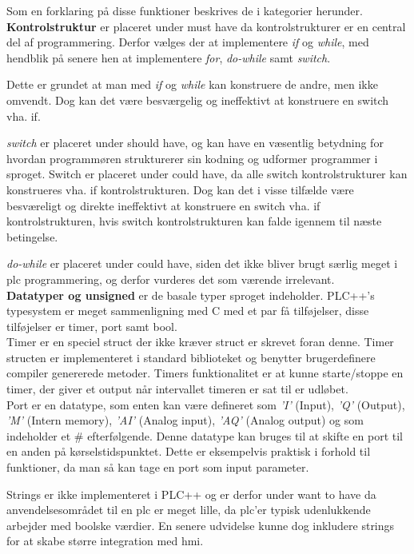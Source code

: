 \noindent Som en forklaring på disse funktioner beskrives de i kategorier herunder.\\

\noindent\textbf{Kontrolstruktur}
er placeret under must have da kontrolstrukturer er en central del af programmering.
Derfor vælges der at implementere \textit{if} og \textit{while}, med hendblik på senere hen at implementere \textit{for}, \textit{do-while} samt \textit{switch}.

Dette er grundet at man med \textit{if} og \textit{while} kan konstruere de andre, men ikke omvendt. Dog kan det være besværgelig og ineffektivt at konstruere en switch vha. if.

\textit{switch} er placeret under should have, og kan have en væsentlig betydning for hvordan programmøren strukturerer sin kodning og udformer programmer i sproget.
Switch er placeret under could have, da alle switch kontrolstrukturer kan konstrueres vha. if kontrolstrukturen. Dog kan det i visse tilfælde være besværeligt og direkte ineffektivt at konstruere en switch vha. if kontrolstrukturen, hvis switch kontrolstrukturen kan falde igennem til næste betingelse.

\textit{do-while} er placeret under could have, siden det ikke bliver brugt særlig meget i \gls{plc} programmering, og derfor vurderes det som værende irrelevant.\\

\noindent\textbf{Datatyper og unsigned}
er de basale typer sproget indeholder. PLC++'s typesystem er meget sammenligning med C med et par få tilføjelser, disse tilføjelser er timer, port samt bool.\\
Timer er en speciel struct der ikke kræver struct er skrevet foran denne. Timer structen er implementeret i standard biblioteket og benytter brugerdefinere compiler genererede metoder. Timers funktionalitet er at kunne starte/stoppe en timer, der giver et output når intervallet timeren er sat til er udløbet.\\
Port er en datatype, som enten kan være defineret som \textit{'I'} (Input), \textit{'Q'} (Output), \textit{'M'} (Intern memory), \textit{'AI'} (Analog input), \textit{'AQ'} (Analog output) og som indeholder et \# efterfølgende. Denne datatype kan bruges til at skifte en port til en anden på kørselstidspunktet. Dette er eksempelvis praktisk i forhold til funktioner, da man så kan tage en port som input parameter.

Strings er ikke implementeret i PLC++ og er derfor under want to have da anvendelsesområdet til en \gls{plc} er meget lille, da \gls{plc}'er typisk udenlukkende arbejder med boolske værdier. En senere udvidelse kunne dog inkludere strings for at skabe større integration med \gls{hmi}.

